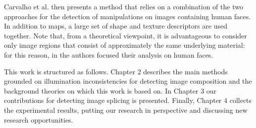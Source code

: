 Carvalho et al. \cite{carvalho2016illuminant} then presents a method that relies on a combination of the two approaches for the detection of manipulations on images containing human faces. In addition to maps, a large set of shape and texture descriptors are used together. Note that, from a theoretical viewpoint, it is advantageous to consider only image regions that consist of approximately the same underlying material: for this reason, in \cite{carvalho2016illuminant} the authors focused their analysis on human faces.

This work is structured as follows. Chapter 2 describes the main methods grounded on illumination inconsistencies for detecting image composition and the background theories on which this work is based on. In Chapter 3 our contributions for detecting image splicing is presented. Finally, Chapter 4 collects the experimental results, putting our research in perspective and discussing new research opportunities.
